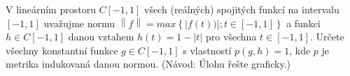 \subsubsection{}

V lineárním prostoru $C\left [ -1,1 \right ]$ všech (reálných) spojitých funkcí
na intervalu $\left [ -1,1 \right ]$ uvažujme normu $\left \| f \right
\|=max\left \{ \left | f(t)) \right |;t \in \left [ -1,1 \right ] \right \}$ a
funkci $h \in C\left [ -1,1 \right ]$ danou vztahem $h(t) = 1 - \left | t
\right |$ pro všechna $ t \in \left [ -1,1 \right ]$. Určete všechny konstantní
funkce $g \in C\left [ -1,1 \right ]$ s vlastností $p\left ( g,h \right )=1$,
kde $p$ je metrika indukovaná danou normou. (Návod: Úlohu řešte graficky.)
